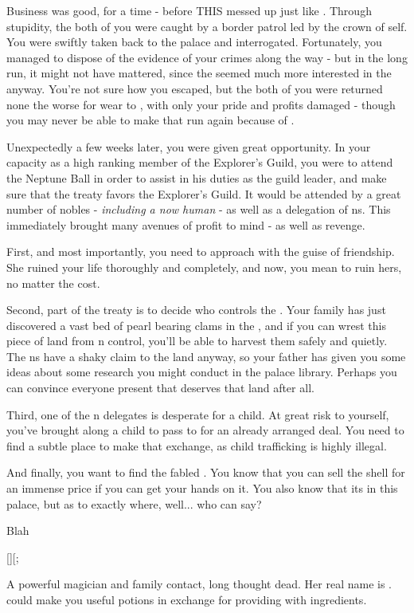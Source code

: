 \documentclass[char]{NeptuneBall}
\begin{document}
Business was good, for a time - before THIS \cPrincess{\prince} messed up just like \cPrincess{\their} \cAriel{\sibling}. Through \cPrincess{\their} stupidity, the both of you were caught by a border patrol led by the crown \cPrince{\Prince} of \pPacifica{} \cPrince{\them}self. You were swiftly taken back to the palace and interrogated. Fortunately, you managed to dispose of the evidence of your crimes along the way - but in the long run, it might not have mattered, since the \cPrince{\prince} seemed much more interested in the \cPrincess{\cprince} anyway. You're not sure how you escaped, but the both of you were returned none the worse for wear to \pAtlantis{}, with only your pride and profits damaged - though you may never be able to make that run again because of \emph{\cPrincess{\them}}.
 
Unexpectedly a few weeks later, you were given great opportunity. In your capacity as a high ranking member of the Explorer's Guild, you were to attend the Neptune Ball in order to assist \cPlant{\prince} \cPlant{} in his duties as the guild leader, and make sure that the treaty favors the Explorer's Guild. It would be attended by a great number of nobles - \emph{including a now human \cAriel{}} - as well as a delegation of \cPacifica{}ns. This immediately brought many avenues of profit to mind - as well as revenge.

First, and most importantly, you need to approach \cAriel{} with the guise of friendship. She ruined your life thoroughly and completely, and now, you mean to ruin hers, no matter the cost.

Second, part of the treaty is to decide who controls the \pGazaStrip{}. Your family has just discovered a vast bed of pearl bearing clams in the \ptrench{}, and if you can wrest this piece of land from \pPacifica{}n control, you'll be able to harvest them safely and quietly. The \pPacifica{}ns have a shaky claim to the land anyway, so your father has given you some ideas about some research you might conduct in the palace library. Perhaps you can convince everyone present that \pAtlantis{} deserves that land after all.

Third, one of the \pPacifica{}n delegates is desperate for a child. At great risk to yourself, you've brought along a child to pass to \cBodyguard{\them} for an already arranged deal. You need to find a subtle place to make that exchange, as child trafficking is highly illegal.

And finally, you want to find the fabled \iGlowShell{}. You know that you can sell the shell for an immense price if you can get your hands on it. You also know that its in this palace, but as to exactly where, well... who can say?

\begin{itemz}[Goals]
  \item Blah
\end{itemz}
[][;
\begin{contacts}
  \contact{\cWitch{}} A powerful magician and family contact, long thought dead. Her real name is \cWitch{\MYname}. \cWitch{\they} could make you useful potions in exchange for providing \cWitch{\them} with ingredients.
\end{contacts}
\end{document}
